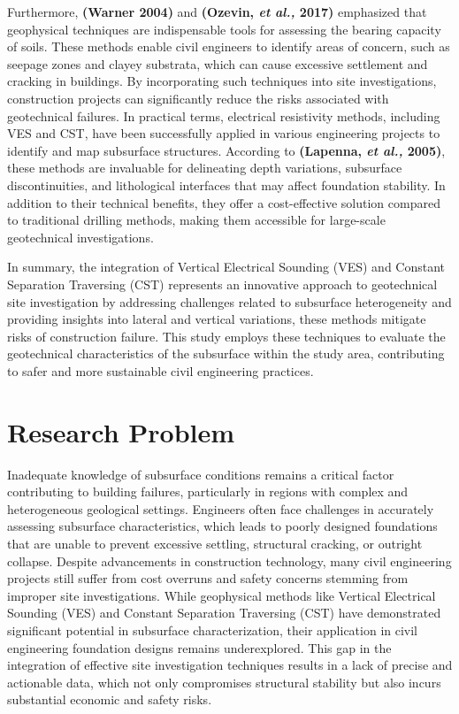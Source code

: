 \documentclass[12pt,a4paper]{report}
\begin{document}
Furthermore, \textbf{(Warner 2004)} and \textbf{(Ozevin, \textit{et al.,} 2017)} emphasized that geophysical techniques are indispensable tools for assessing the bearing capacity of soils. These methods enable civil engineers to identify areas of concern, such as seepage zones and clayey substrata, which can cause excessive settlement and cracking in buildings. By incorporating such techniques into site investigations, construction projects can significantly reduce the risks associated with geotechnical failures. In practical terms, electrical resistivity methods, including VES and CST, have been successfully applied in various engineering projects to identify and map subsurface structures. According to \textbf{(Lapenna, \textit{et al.,} 2005)}, these methods are invaluable for delineating depth variations, subsurface discontinuities, and lithological interfaces that may affect foundation stability. In addition to their technical benefits, they offer a cost-effective solution compared to traditional drilling methods, making them accessible for large-scale geotechnical investigations.

In summary, the integration of Vertical Electrical Sounding (VES) and Constant Separation Traversing (CST) represents an innovative approach to geotechnical site investigation by addressing challenges related to subsurface heterogeneity and providing insights into lateral and vertical variations, these methods mitigate risks of construction failure. This study employs these techniques to evaluate the geotechnical characteristics of the subsurface within the study area, contributing to safer and more sustainable civil engineering practices.

\section{Research Problem}
Inadequate knowledge of subsurface conditions remains a critical factor contributing to building failures, particularly in regions with complex and heterogeneous geological settings. Engineers often face challenges in accurately assessing subsurface characteristics, which leads to poorly designed foundations that are unable to prevent excessive settling, structural cracking, or outright collapse. Despite advancements in construction technology, many civil engineering projects still suffer from cost overruns and safety concerns stemming from improper site investigations.
While geophysical methods like Vertical Electrical Sounding (VES) and Constant Separation Traversing (CST) have demonstrated significant potential in subsurface characterization, their application in civil engineering foundation designs remains underexplored. This gap in the integration of effective site investigation techniques results in a lack of precise and actionable data, which not only compromises structural stability but also incurs substantial economic and safety risks.
\end{document}
